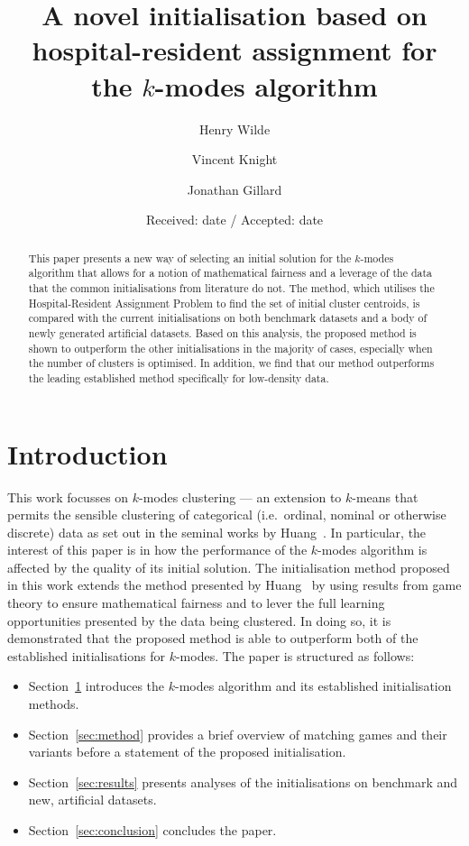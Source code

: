 \documentclass[smallextended]{svjour3}
\title{%
    A novel initialisation based on hospital-resident assignment for the
    \(k\)-modes algorithm
}
\author{Henry Wilde \and Vincent Knight \and Jonathan Gillard}
\institute{%
    School of Mathematics, Senghennydd Rd, Cardiff, WALES CF24 4AG \\
    \textit{\email{\{wildehd, knightva, gillardjw\}@cardiff.ac.uk}}
}
\date{Received: date / Accepted: date}
\begin{document}
\maketitle%

\begin{abstract}
    This paper presents a new way of selecting an initial solution for the
    \(k\)-modes algorithm that allows for a notion of mathematical fairness and
    a leverage of the data that the common initialisations from literature do
    not. The method, which utilises the Hospital-Resident Assignment Problem to
    find the set of initial cluster centroids, is compared with the current
    initialisations on both benchmark datasets and a body of newly generated
    artificial datasets. Based on this analysis, the proposed method is shown to
    outperform the other initialisations in the majority of cases, especially
    when the number of clusters is optimised. In addition, we find that our
    method outperforms the leading established method specifically for
    low-density data.

\end{abstract}
\section{Introduction}\label{sec:intro}

This work focusses on \(k\)-modes clustering --- an extension to
\(k\)-means that permits the sensible clustering of categorical (i.e.\ ordinal,
nominal or otherwise discrete) data as set out in the seminal works by
Huang~\cite{Huang1997a,Huang1997b,Huang1998}. In particular, the interest of
this paper is in how the performance of the \(k\)-modes algorithm is affected by
the quality of its initial solution. The initialisation method proposed in this
work extends the method presented by Huang~\cite{Huang1998} by using results
from game theory to ensure mathematical fairness and to lever the full learning
opportunities presented by the data being clustered. In doing so, it is
demonstrated that the proposed method is able to outperform both of the
established initialisations for \(k\)-modes. The paper is structured as follows:
\begin{itemize}
    \item Section~\ref{sec:intro} introduces the \(k\)-modes algorithm and its
        established initialisation methods.
    \item Section~\ref{sec:method} provides a brief overview of
        matching games and their variants before a statement of the proposed
        initialisation.
    \item Section~\ref{sec:results} presents analyses of the initialisations
        on benchmark and new, artificial datasets.
    \item Section~\ref{sec:conclusion} concludes the paper.
\end{itemize}
\end{document}
